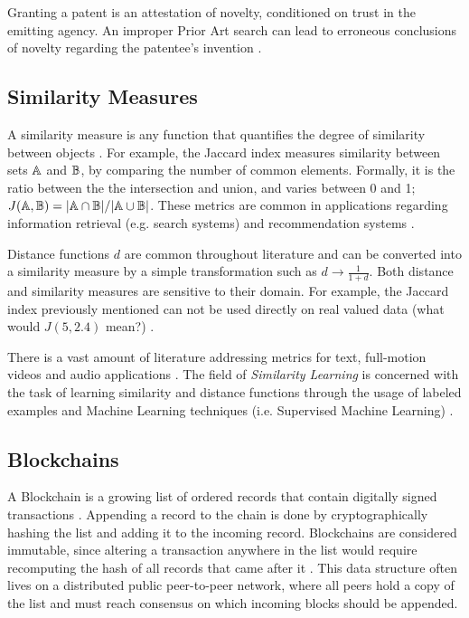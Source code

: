 \documentclass[conference]{IEEEtran}
\begin{document}
Granting a patent is an attestation of novelty, conditioned on trust in the emitting agency. An improper Prior Art search can lead to erroneous conclusions of novelty regarding the patentee's invention \cite{bashir2010improving}. 

\subsection{Similarity Measures}
A similarity measure is any function that quantifies the degree of similarity between objects \cite{lesot2009similarity}. For example, the Jaccard index measures similarity between sets ${\mathbb{A}}$ and ${\mathbb{B}}$, by comparing the number of common elements. Formally, it is the ratio between the the intersection and union, and varies between 0 and 1; $J({\mathbb{A}}, {\mathbb{B}}) = \vert{\mathbb{A}}\cap{\mathbb{B}}\vert/\vert{\mathbb{A}}\cup{\mathbb{B}}\vert$. These metrics are common in applications regarding information retrieval (e.g. search systems) and recommendation systems \cite{metzler2007similarity}.

Distance functions $d$ are common throughout literature and can be converted into a similarity measure by a simple transformation such as $d \to \frac{1}{1+d}$. Both distance and similarity measures are sensitive to their domain. For example, the Jaccard index previously mentioned can not be used directly on real valued data (what would $J(5, 2.4)$ mean?)  \cite{lesot2009similarity}.

There is a vast amount of literature addressing metrics for text, full-motion videos and audio applications \cite{kulis2013metric}. The field of \emph{Similarity Learning} is concerned with the task of learning similarity and distance functions through the usage of labeled examples and Machine Learning techniques (i.e. Supervised Machine Learning) \cite{kulis2013metric}.
 

\subsection{Blockchains}
A Blockchain is a growing list of ordered records that contain digitally signed transactions \cite{antonopoulos2018mastering}. Appending a record to the chain is done by cryptographically hashing the list and adding it to the incoming record. Blockchains are considered immutable, since altering a transaction anywhere in the list would require recomputing the hash of all records that came after it \cite{antonopoulos2018mastering}. This data structure often lives on a distributed public peer-to-peer network, where all peers hold a copy of the list and must reach consensus on which incoming blocks should be appended. 
\end{document}
